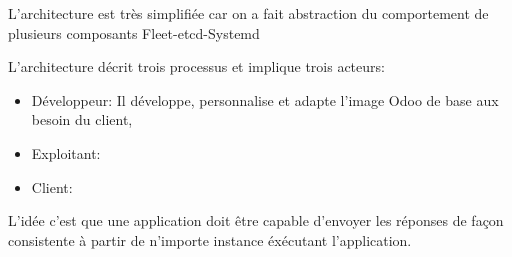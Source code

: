 \begin{onehalfspace}
L'architecture est très simplifiée car on a fait abstraction du comportement de plusieurs composants Fleet-etcd-Systemd


L'architecture décrit trois processus et implique trois acteurs:

\begin{itemize}
 	\item Développeur: Il développe, personnalise et adapte l'image Odoo de base aux besoin du client,
 	\item Exploitant:
 	\item Client:
 \end{itemize} 


L'idée c'est que une application doit être capable d'envoyer les réponses de façon consistente à partir de n'importe instance éxécutant l'application.


\end{onehalfspace}

